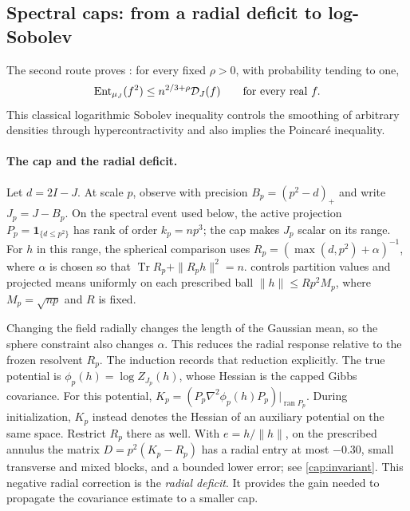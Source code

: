 \subsection{Spectral caps: from a radial deficit to log-Sobolev}

The second route proves : for every fixed $\rho>0$,
with probability tending to one,
\[
 \operatorname{Ent}_{\mu_J}(f^2)\le n^{2/3+\rho}\mathcal D_J(f)
 \qquad\text{for every real }f.
\]
This classical logarithmic Sobolev inequality controls the smoothing of
arbitrary densities through hypercontractivity and also implies the
Poincar\'e inequality.

\paragraph{The cap and the radial deficit.}
Let $d=2I-J$. At scale $p$, observe with precision
$B_p=(p^2-d)_+$ and write $J_p=J-B_p$. On the spectral event used below,
the active projection $P_p=\mathbf1_{\{d\le p^2\}}$ has rank of order
$k_p=np^3$; the cap makes $J_p$ scalar on its range. For $h$ in this range, the
spherical comparison uses
$R_p=(\max(d,p^2)+\alpha)^{-1}$, where $\alpha$ is chosen so that
$\operatorname{Tr}R_p+\|R_ph\|^2=n$. 
controls partition values and projected means uniformly on each prescribed
ball $\|h\|\le R p^2M_p$, where $M_p=\sqrt{np}$ and $R$ is fixed.

Changing the field radially changes the length of the Gaussian mean, so
the sphere constraint also changes $\alpha$. This reduces the radial
response relative to the frozen resolvent $R_p$. The induction records
that reduction explicitly. The true potential is
$\phi_p(h)=\log Z_{J_p}(h)$, whose Hessian is the capped Gibbs covariance.
For this potential,
$K_p=(P_p\nabla^2\phi_p(h)P_p)|_{\operatorname{ran}P_p}$.
During initialization, $K_p$ instead denotes the Hessian of an auxiliary
potential on the same space. Restrict $R_p$ there as well. With
$e=h/\|h\|$, on the prescribed annulus
the matrix $D=p^2(K_p-R_p)$ has a radial entry at most $-0.30$, small
transverse and mixed blocks, and a bounded lower error; see
\eqref{cap:invariant}. This negative radial correction is the
\emph{radial deficit}. It provides the gain needed to propagate the
covariance estimate to a smaller cap.

